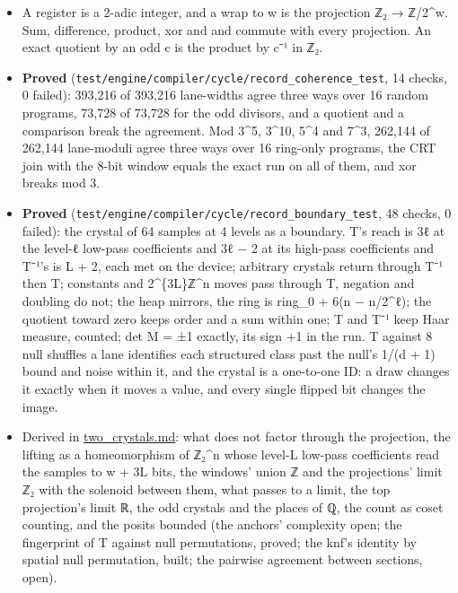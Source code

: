 \begin{itemize}
\begin{itemize}
\item A register is a 2-adic integer, and a wrap to w is the projection ℤ₂ → ℤ/2\textasciicircum{}w. Sum, difference, product, xor and and commute with every projection. An exact quotient by an odd c is the product by c⁻¹ in ℤ₂.
\item \textbf{Proved} (\texttt{test/\allowbreak{}engine/\allowbreak{}compiler/\allowbreak{}cycle/\allowbreak{}record\_\allowbreak{}coherence\_\allowbreak{}test}, 14 checks, 0 failed): 393,216 of 393,216 lane-widths agree three ways over 16 random programs, 73,728 of 73,728 for the odd divisors, and a quotient and a comparison break the agreement. Mod 3\textasciicircum{}5, 3\textasciicircum{}10, 5\textasciicircum{}4 and 7\textasciicircum{}3, 262,144 of 262,144 lane-moduli agree three ways over 16 ring-only programs, the CRT join with the 8-bit window equals the exact run on all of them, and xor breaks mod 3.
\item \textbf{Proved} (\texttt{test/\allowbreak{}engine/\allowbreak{}compiler/\allowbreak{}cycle/\allowbreak{}record\_\allowbreak{}boundary\_\allowbreak{}test}, 48 checks, 0 failed): the crystal of 64 samples at 4 levels as a boundary. T's reach is 3ℓ at the level-ℓ low-pass coefficients and 3ℓ − 2 at its high-pass coefficients and T⁻¹'s is L + 2, each met on the device; arbitrary crystals return through T⁻¹ then T; constants and 2\textasciicircum{}\{3L\}ℤ\textasciicircum{}n moves pass through T, negation and doubling do not; the heap mirrors, the ring is ring\_\allowbreak{}0 + 6(n − n/2\textasciicircum{}ℓ); the quotient toward zero keeps order and a sum within one; T and T⁻¹ keep Haar measure, counted; det M = ±1 exactly, its sign +1 in the run. T against 8 null shuffles a lane identifies each structured class past the null's 1/(d + 1) bound and noise within it, and the crystal is a one-to-one ID: a draw changes it exactly when it moves a value, and every single flipped bit changes the image.
\item Derived in \hyperref[chap:two-crystals]{two\_\allowbreak{}crystals.md}: what does not factor through the projection, the lifting as a homeomorphism of ℤ₂\textasciicircum{}n whose level-L low-pass coefficients read the samples to w + 3L bits, the windows' union ℤ and the projections' limit ℤ₂ with the solenoid between them, what passes to a limit, the top projection's limit ℝ, the odd crystals and the places of ℚ, the count as coset counting, and the posits bounded (the anchors' complexity open; the fingerprint of T against null permutations, proved; the knf's identity by spatial null permutation, built; the pairwise agreement between sections, open).

\end{itemize}
\end{itemize}
